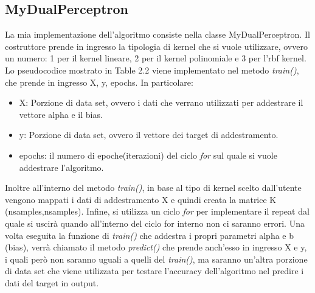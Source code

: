 \documentclass{article}
\begin{document}
    \subsection{MyDualPerceptron}
    La mia implementazione dell'algoritmo consiste nella classe MyDualPerceptron. Il costruttore prende in ingresso la tipologia di kernel che si vuole utilizzare, ovvero un numero: 1 per il kernel lineare, 2 per il kernel polinomiale e 3 per l'rbf kernel. Lo pseudocodice mostrato in Table 2.2 viene implementato nel metodo \textit{train()}, che prende in ingresso X, y, epochs. In particolare:
    \begin{itemize}
    	\item X: Porzione di data set, ovvero i dati che verrano utilizzati per addestrare il vettore alpha e il bias.
    	\item y: Porzione di data set, ovvero il vettore dei target di addestramento.
    	\item epochs: il numero di epoche(iterazioni) del ciclo \textit{for} sul quale si vuole addestrare l'algoritmo.
    \end{itemize}
	Inoltre all'interno del metodo \textit{train()}, in base al tipo di kernel scelto dall'utente vengono mappati i dati di addestramento X e quindi creata la matrice K (nsamples,nsamples). Infine, si utilizza un ciclo \textit{for} per implementare il repeat dal quale si uscirà quando all'interno del ciclo for interno non ci saranno errori.
    Una volta eseguita la funzione di \textit{train()} che addestra i propri parametri alpha e b (bias), verrà chiamato il metodo \textit{predict()} che prende anch'esso in ingresso X e y, i quali però non saranno uguali a quelli del \textit{train()}, ma saranno un'altra porzione di data set che viene utilizzata per testare l'accuracy dell'algoritmo nel predire i dati del target in output.
\end{document}
